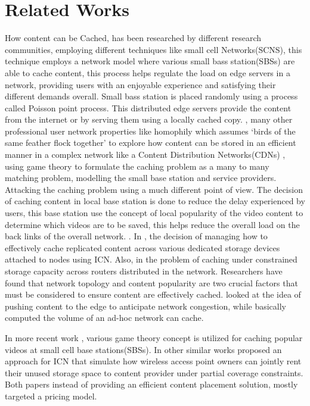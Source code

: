 \chapter{Related Works}

How content can be Cached, has been researched by different research communities, employing different techniques like small cell Networks(SCNS), this technique employs a network model where various small bass station(SBSs) are able to cache content, this process helps regulate the load on edge servers in a network, providing users with an enjoyable experience and satisfying their different demands overall. Small bass station is placed randomly using a process called Poisson point process. This distributed edge servers provide the content from the internet or by serving them using a locally cached copy. \cite{bacstucache}\cite{bharathlearning}, many other professional user network properties like homophily which assumes ‘birds of the same feather flock together’ to explore how content can be stored in an efficient manner in a complex network like a Content Distribution Networks(CDNs) , using game theory to formulate the caching problem as a many to many matching problem, modelling the small base station and service providers. Attacking the caching problem using a much different point of view. The decision of caching content in local base station is done to reduce the delay experienced by users, this base station use the concept of local popularity of the video content to determine which videos are to be saved, this helps reduce the overall load on the back links of the overall network. \cite{hamidouchemany}. In \cite{sourlasdistributed}, the decision of managing how to effectively cache replicated content across various dedicated storage devices attached to nodes using ICN. Also, in \cite{wangdesign} the problem of caching under constrained storage capacity across routers distributed in the network. Researchers have found that network topology and content popularity are two crucial factors that must be considered to ensure content are effectively cached. \cite{yucongestion} looked at the idea of pushing content to the edge to anticipate network congestion, while \cite{azimdoostfundamental} basically computed the volume of an ad-hoc network can cache. 

In more recent work \cite{li2016pricing}, various game theory concept is utilized for caching popular videos at small cell base stations(SBSs). In other similar works \cite{mangilibandwidth} proposed an approach for ICN that simulate how wireless access point owners can jointly rent their unused storage space to content provider under partial coverage constraints. Both papers instead of providing an efficient content placement solution, mostly targeted a pricing model. 

